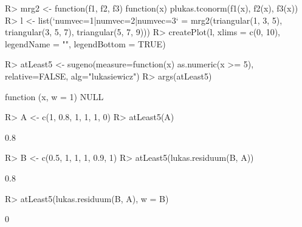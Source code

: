 \documentclass{article}\usepackage[]{graphicx}\usepackage[]{color}
\begin{document}
\begin{Schunk}
\begin{Sinput}
R> mrg2 <- function(f1, f2, f3) {
       function(x) {
           plukas.tconorm(f1(x), f2(x), f3(x))
       }
   }
R> l <- list(`numvec=1|numvec=2|numvec=3` = mrg2(triangular(1, 3, 5), triangular(3, 
       5, 7), triangular(5, 7, 9)))
R> createPlot(l, xlims = c(0, 10), legendName = "", legendBottom = TRUE)
\end{Sinput}
\end{Schunk}

\begin{Schunk}
% --begin: "quant1"
\begin{Sinput}
R> atLeast5 <- sugeno(measure=function(x) as.numeric(x >= 5),
                      relative=FALSE,
                      alg="lukasiewicz")
R> args(atLeast5)
\end{Sinput}
\begin{Soutput}
function (x, w = 1) 
NULL
\end{Soutput}
%
% --end: "quant1"
\end{Schunk}

\begin{Schunk}
% --begin: "quant2"
\begin{Sinput}
R> A <- c(1, 0.8, 1, 1, 1, 0)
R> atLeast5(A)
\end{Sinput}
\begin{Soutput}
[1] 0.8
\end{Soutput}
%
% --end: "quant2"
\end{Schunk}

\begin{Schunk}
% --begin: "quant3"
\begin{Sinput}
R> B <- c(0.5, 1, 1, 1, 0.9, 1)
R> atLeast5(lukas.residuum(B, A))
\end{Sinput}
\begin{Soutput}
[1] 0.8
\end{Soutput}
%
% --end: "quant3"
\end{Schunk}

\begin{Schunk}
% --begin: "quant4"
\begin{Sinput}
R> atLeast5(lukas.residuum(B, A), w = B)
\end{Sinput}
\begin{Soutput}
[1] 0
\end{Soutput}
%
% --end: "quant4"
\end{Schunk}
\end{document}

